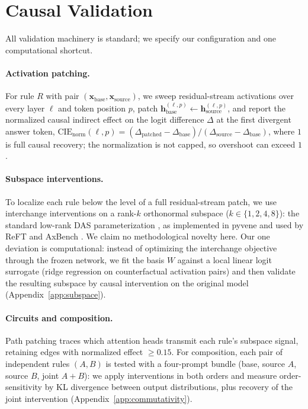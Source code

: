 \section{Causal Validation}
\label{sec:validation}

All validation machinery is standard; we specify our configuration and one
computational shortcut.

\paragraph{Activation patching.} For rule $R$ with pair
$(\mathbf{x}_{\text{base}}, \mathbf{x}_{\text{source}})$, we sweep residual-stream
activations over every layer $\ell$ and token position $p$, patch
$\mathbf{h}^{(\ell,p)}_{\text{base}} \leftarrow
\mathbf{h}^{(\ell,p)}_{\text{source}}$, and report the normalized causal
indirect effect on the logit difference $\Delta$ at the first divergent
answer token,
$\mathrm{CIE}_{\mathrm{norm}}(\ell,p) =
(\Delta_{\text{patched}} - \Delta_{\text{base}}) /
(\Delta_{\text{source}} - \Delta_{\text{base}})$,
where $1$ is full causal recovery; the normalization is not capped, so
overshoot can exceed $1$ \citep{vig2020,meng2022,zhang2024}.

\paragraph{Subspace interventions.} To localize each rule below the level
of a full residual-stream patch, we use interchange interventions on a
rank-$k$ orthonormal subspace ($k \in \{1,2,4,8\}$): the standard low-rank
DAS parameterization \citep{geiger2024das,wu2023boundless}, as implemented
in pyvene \citep{wu2024pyvene} and used by ReFT \citep{wu2024reft} and
AxBench \citep{wu2025axbench}. We claim no methodological novelty here.
Our one deviation is computational: instead of optimizing the interchange
objective through the frozen network, we fit the basis $W$ against a local
linear logit surrogate (ridge regression on counterfactual activation
pairs) and then validate the resulting subspace by causal intervention on
the original model (Appendix~\ref{app:subspace}). 

\paragraph{Circuits and composition.} Path patching
\citep{wang2022ioi,goldowskydill2023} traces which attention heads
transmit each rule's subspace signal, retaining edges with normalized
effect $\ge 0.15$. For composition, each pair of independent rules
$(A,B)$ is tested with a four-prompt bundle (base, source $A$, source $B$,
joint $A{+}B$): we apply interventions in both orders and measure
order-sensitivity by KL divergence between output distributions, plus
recovery of the joint intervention (Appendix~\ref{app:commutativity}).

